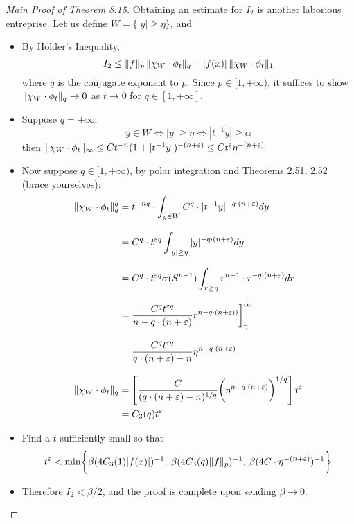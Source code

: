 \documentclass[../../main.tex]{subfiles}
\begin{document}
\begin{proof}[Main Proof of Theorem 8.15]
    Obtaining an estimate for $I_2$ is another laborious entreprise. Let us define $W = \{|y|\geq \eta\}$, and
    \begin{itemize}
        \item By Holder's Inequality, \[I_2\leq \lVert {f} \rVert_p\,\lVert {\chi_W\cdot \phi_t} \rVert_q + |f(x)|\,\lVert {\chi_W\cdot\phi_t} \rVert_1\] where $q$ is the conjugate exponent to $p$. Since $p\in[1,+\infty)$, it suffices to show $\lVert {\chi_W\cdot \phi_t} \rVert_q\to 0$ as $t\to 0$ for $q\in[1,+\infty]$.
        \item Suppose $q = +\infty$, 
        \[y\in W\iff |y|\geq\eta\iff |t^{-1}y|\geq\alpha\]
        then $\lVert {\chi_W\cdot \phi_t} \rVert_\infty\leq Ct^{-n}(1+|t^{-1}y|)^{-(n+\varepsilon)}\leq Ct^{\varepsilon}\eta^{-(n+\varepsilon)}$
        \item Now suppose $q\in[1,+\infty)$, by polar integration and Theorems 2.51, 2.52 (brace yourselves):
        \begin{align*}
            \lVert {\chi_W\cdot\phi_t} \rVert_q^q&=t^{-nq}\cdot\int_{y\in W}C^q\cdot|t^{-1}y|^{-q\cdot(n+\varepsilon)}dy\\[2ex]
            &= C^q\cdot t^{\varepsilon q}\int_{|y|\geq \eta}|y|^{-q\cdot(n+\varepsilon)}dy\\[2ex]
            &= C^q\cdot t^{\varepsilon q}\sigma(S^{n-1})\int_{r\geq\eta}r^{n-1}\cdot r^{-q\cdot(n+\varepsilon)}dr\\[2ex]
            &=\dfrac{C^qt^{\varepsilon q}}{n- q\cdot(n+\varepsilon)}r^{n-q\cdot(n+\varepsilon))}\biggr]^\infty_\eta\\[2ex]
            &=\dfrac{C^qt^{\varepsilon q}}{q\cdot(n+\varepsilon)-n}\eta^{n-q\cdot(n+\varepsilon)}\\[2ex]
            \lVert {\chi_W\cdot\phi_t} \rVert_q&=\left[\dfrac{C}{(q\cdot(n+\varepsilon)-n)^{1/q}}\biggl(\eta^{n-q\cdot(n+\varepsilon)}\biggr)^{1/q}\right]t^{\varepsilon}\\
            &=C_3(q)t^\varepsilon
        \end{align*}
        \item Find a $t$ sufficiently small so that
        \[
        t^\varepsilon< \min\biggl\{\beta(4C_3(1)|f(x)|)^{-1}
        ,\: \beta(4C_3(q)\lVert {f} \rVert_p)^{-1}\\[2ex]
        ,\: \beta(4C\cdot \eta^{-(n+\varepsilon)})^{-1}\biggr\}
        \]
        
        \item Therefore $I_2<\beta/2$, and the proof is complete upon sending $\beta\to 0$.
    \end{itemize}
\end{proof}\newpage
\end{document}
